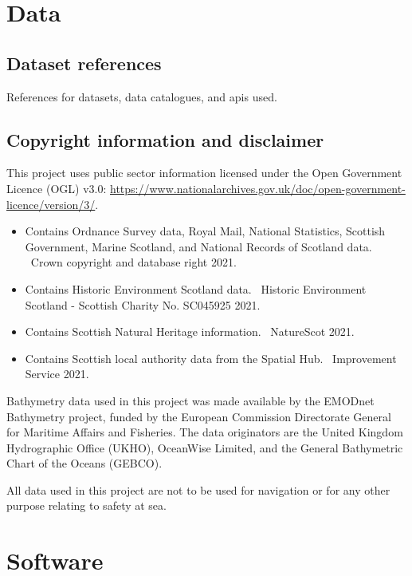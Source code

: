 \chapter{Data \label{app:data}}

\section*{Dataset references}

References for datasets, data catalogues, and \glspl{api} used.

\printbibliography[heading=none,keyword=data]

\section*{Copyright information and disclaimer}

This project uses public sector information licensed under the Open Government
Licence (OGL) v3.0:
\url{https://www.nationalarchives.gov.uk/doc/open-government-licence/version/3/}.

\begin{itemize}[noitemsep]
  \item Contains Ordnance Survey data, Royal Mail, National Statistics,
  Scottish Government, Marine Scotland, and National Records of Scotland data.
  \textcopyright~Crown copyright and database right 2021.
  \item Contains Historic Environment Scotland data. \textcopyright~Historic
  Environment Scotland - Scottish Charity No. SC045925 2021.
  \item Contains Scottish Natural Heritage information.
  \textcopyright~NatureScot 2021.
  \item Contains Scottish local authority data from the Spatial Hub.
  \textcopyright~Improvement Service 2021.
\end{itemize}

Bathymetry data used in this project was made available by the EMODnet
Bathymetry project, funded by the European Commission Directorate General for
Maritime Affairs and Fisheries. The data originators are the United Kingdom
Hydrographic Office (UKHO), OceanWise Limited, and the General Bathymetric
Chart of the Oceans (GEBCO).

All data used in this project are not to be used for navigation or for any
other purpose relating to safety at sea.

\chapter{Software \label{app:soft}}

